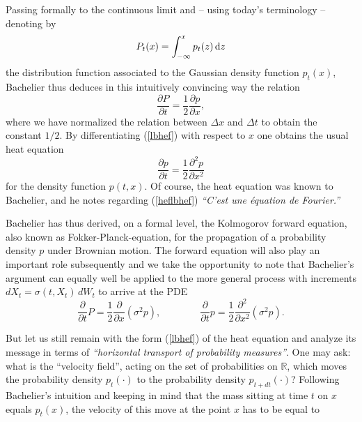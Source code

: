 \documentclass[11pt,a4paper]{article}%
\def\R{{\mathbb R}}
\newtheorem{remark}[theorem]{Remark}
\numberwithin{equation}{section}
\begin{document}
\medskip

Passing formally to the continuous limit and -- using today's terminology -- denoting by 
\begin{equation} \label{dist}
P_t(x) = \int_{-\infty}^{x} p_t(z) \, \textnormal{d}z
\end{equation}
the distribution function associated to the Gaussian density function $p_t(x)$, Bachelier thus deduces in this intuitively convincing way the relation
\begin{equation} \label{lbhef}
\frac{\partial P}{\partial t} = \frac{1}{2} \frac{\partial p}{\partial x},
\end{equation}
where we have normalized the relation between $\Delta x$ and $\Delta t$ to obtain the constant $1/2$. By differentiating 
(\ref{lbhef}) with respect to $x$ one obtains the usual heat equation 
\begin{equation} \label{heflbhef}
\frac{\partial p}{\partial t} = \frac{1}{2} \frac{\partial^{2} p}{\partial x^{2}}
\end{equation}
for the density function $p(t,x)$. 
Of course, the heat equation was known to Bachelier, and he notes regarding (\ref{heflbhef})
 \textit{``C'est une {\'e}quation de Fourier.''}

Bachelier has thus derived, on a formal level, the Kolmogorov forward equation, also known as Fokker-Planck-equation, for the propagation of a probability density $p$ under Brownian motion. The forward equation will also play an important role subsequently and we take the opportunity to note that Bachelier's argument can equally well be applied to the more general process with increments $dX_t = \sigma(t,X_t)\, dW_t$ to arrive at the PDE
\begin{equation}\label{Fokker0}
\frac{\partial}{\partial t} P= \frac{1}{2} \frac{\partial}{\partial x} \left(\sigma^2 p\right),
\qquad \qquad
\frac{\partial}{\partial t}p = \frac12 \frac{\partial^2}{\partial x^2}\left(\sigma^2 p\right).
\end{equation}







But let us still remain with the form (\ref{lbhef})
 of the heat equation and analyze its message in terms of \textit{``horizontal transport of probability measures''}. One may ask: what is the ``velocity field'', acting on the set of probabilities on $\R$, which moves the probability density $p_t(\cdot)$ to the probability density $p_{t+dt}(\cdot)$? Following Bachelier's intuition and keeping in mind that the mass sitting at time $t$ on $x$ equals $p_t(x)$, the velocity of this move at the point $x$ has to be equal to
 
\end{document}
